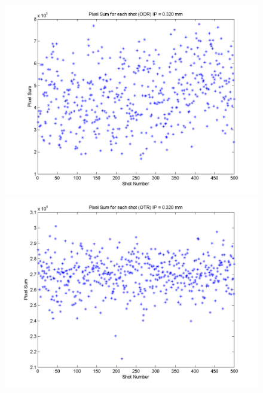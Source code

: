 \documentclass[12pt]{article}
\begin{document}
\begin{figure}
\begin{center}
\includegraphics[scale=0.5]{Figures/PixelSum_ODR_320.PNG}
\includegraphics[scale=0.5]{Figures/PixelSum_OTR_320.PNG}
\caption{}
\end{center}
\end{figure}
\end{document}
